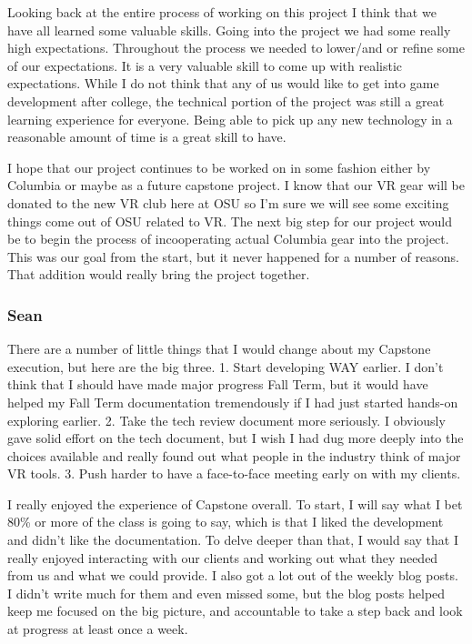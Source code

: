 \documentclass[10pt,journal,compsoc,onecolumn, draftclsnofoot]{IEEEtran}
\begin{document}
Looking back at the entire process of working on this project I think that we have all learned some valuable skills. Going into the project we had some really high expectations. Throughout the process we needed to lower/and or refine some of our expectations. It is a very valuable skill to come up with realistic expectations. While I do not think that any of us would like to get into game development after college, the technical portion of the project was still a great learning experience for everyone. Being able to pick up any new technology in a reasonable amount of time is a great skill to have.

I hope that our project continues to be worked on in some fashion either by Columbia or maybe as a future capstone project. I know that our VR gear will be donated to the new VR club here at OSU so I'm sure we will see some exciting things come out of OSU related to VR. The next big step for our project would be to begin the process of incooperating actual Columbia gear into the project. This was our goal from the start, but it never happened for a number of reasons. That addition would really bring the project together.


\subsubsection{Sean}

There are a number of little things that I would change about my Capstone execution, but here are the big three.
1. Start developing WAY earlier. I don't think that I should have made major progress Fall Term, but it would have helped my Fall Term documentation tremendously if I had just started hands-on exploring earlier.
2. Take the tech review document more seriously. I obviously gave solid effort on the tech document, but I wish I had dug more deeply into the choices available and really found out what people in the industry think of major VR tools.
3. Push harder to have a face-to-face meeting early on with my clients.

I really enjoyed the experience of Capstone overall. To start, I will say what I bet 80\% or more of the class is going to say, which is that I liked the development and didn't like the documentation. To delve deeper than that, I would say that I really enjoyed interacting with our clients and working out what they needed from us and what we could provide. I also got a lot out of the weekly blog posts. I didn't write much for them and even missed some, but the blog posts helped keep me focused on the big picture, and accountable to take a step back and look at progress at least once a week.
\end{document}
